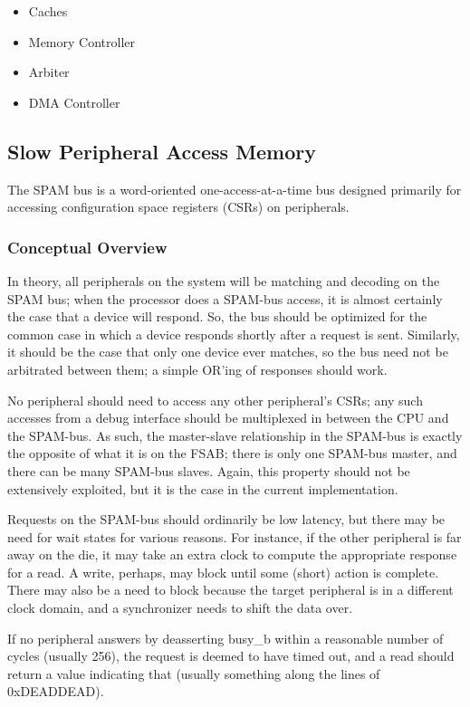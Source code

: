 \documentclass[10pt,twocolumn]{article}
\begin{document}
\begin{itemize}
\item{Caches}
\item{Memory Controller}
\item{Arbiter}
\item{DMA Controller}
\end{itemize}

\subsection{Slow Peripheral Access Memory}

The SPAM bus is a word-oriented one-access-at-a-time bus designed primarily
for accessing configuration space registers (CSRs) on peripherals.

\subsubsection{Conceptual Overview}

In theory, all peripherals on the system will be matching and decoding on
the SPAM bus; when the processor does a SPAM-bus access, it is almost
certainly the case that a device will respond.  So, the bus should be
optimized for the common case in which a device responds shortly after a
request is sent.  Similarly, it should be the case that only one device ever
matches, so the bus need not be arbitrated between them; a simple OR'ing of
responses should work.

No peripheral should need to access any other peripheral's CSRs; any such
accesses from a debug interface should be multiplexed in between the CPU and
the SPAM-bus.  As such, the master-slave relationship in the SPAM-bus is
exactly the opposite of what it is on the FSAB; there is only one SPAM-bus
master, and there can be many SPAM-bus slaves.  Again, this property should
not be extensively exploited, but it is the case in the current
implementation.

Requests on the SPAM-bus should ordinarily be low latency, but there may be
need for wait states for various reasons.  For instance, if the other
peripheral is far away on the die, it may take an extra clock to compute the
appropriate response for a read.  A write, perhaps, may block until some
(short) action is complete.  There may also be a need to block because the
target peripheral is in a different clock domain, and a synchronizer needs
to shift the data over.

If no peripheral answers by deasserting busy\_b within a reasonable number
of cycles (usually 256), the request is deemed to have timed out, and a read
should return a value indicating that (usually something along the lines of
0xDEADDEAD).
\end{document}
